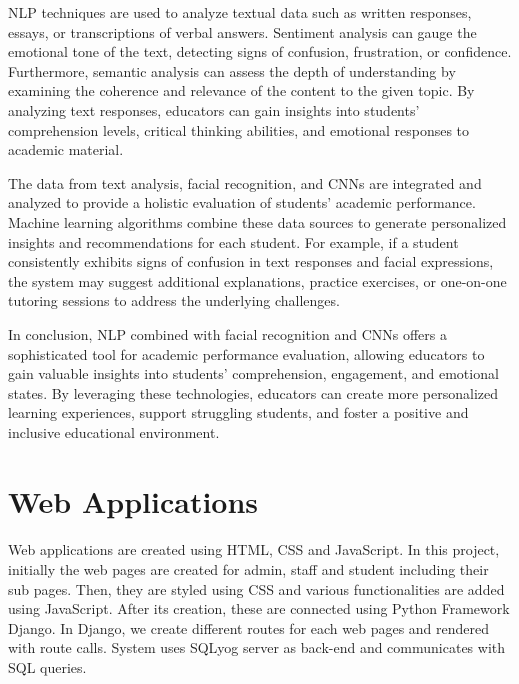 \par NLP techniques are used to analyze textual data such as written responses, essays, or transcriptions of verbal answers. Sentiment analysis can gauge the emotional tone of the text, detecting signs of confusion, frustration, or confidence. Furthermore, semantic analysis can assess the depth of understanding by examining the coherence and relevance of the content to the given topic. By analyzing text responses, educators can gain insights into students' comprehension levels, critical thinking abilities, and emotional responses to academic material.

\par The data from text analysis, facial recognition, and CNNs are integrated and analyzed to provide a holistic evaluation of students' academic performance. Machine learning algorithms combine these data sources to generate personalized insights and recommendations for each student. For example, if a student consistently exhibits signs of confusion in text responses and facial expressions, the system may suggest additional explanations, practice exercises, or one-on-one tutoring sessions to address the underlying challenges.

\par In conclusion, NLP combined with facial recognition and CNNs offers a sophisticated tool for academic performance evaluation, allowing educators to gain valuable insights into students' comprehension, engagement, and emotional states. By leveraging these technologies, educators can create more personalized learning experiences, support struggling students, and foster a positive and inclusive educational environment.


\section{Web Applications}
\paragraph{} Web applications are created using HTML, CSS and JavaScript. In this project, initially the web pages are created for admin, staff and student including their sub pages. Then, they are styled using CSS and various functionalities are added using JavaScript. After its creation, these are connected using Python Framework Django. In Django, we create different routes for each web pages and rendered with route calls. System uses SQLyog server as back-end and communicates with SQL queries.

